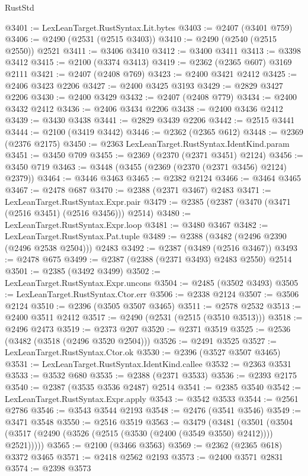 \begin{lexlean}{RustStd}
\begin{coremodule}
{\begin{coremodule}
{{{{{{{{{{{{{{{{{{{{{{{{{{{{{{{{{{{{{{{{{{{{{{{{{{@3401 := LexLeanTarget.RustSyntax.Lit.bytes
@3403 := @2407 (@3401 @759)
@3406 := @2490 (@2531 (@2515 @3403))
@3410 := @2490 (@2540 (@2515 @2550)) @2521
@3411 := @3406 @3410
@3412 := @3400 @3411
@3413 := @3398 @3412
@3415 := @2100 (@3374 @3413)
@3419 := @2362 (@2365 @607) @3169 @2111
@3421 := @2407 (@2408 @769)
@3423 := @2400 @3421 @2412
@3425 := @2406 @3423 @2206
@3427 := @2400 @3425 @3193
@3429 := @2829 @3427 @2206
@3430 := @2400 @3429
@3432 := @2407 (@2408 @779)
@3434 := @2400 @3432 @2412
@3436 := @2406 @3434 @2206
@3438 := @2400 @3436 @2412
@3439 := @3430 @3438
@3441 := @2829 @3439 @2206
@3442 := @2515 @3441
@3444 := @2100 (@3419 @3442)
@3446 := @2362 (@2365 @612)
@3448 := @2369 (@2376 @2175)
@3450 := @2363 LexLeanTarget.RustSyntax.IdentKind.param
@3451 := @3450 @709
@3455 := @2369 (@2370 (@2371 @3451) @2124)
@3456 := @3450 @719
@3463 := @3448 (@3455 (@2369 (@2370 (@2371 @3456) @2124) @2379))
@3464 := @3446 @3463
@3465 := @2382 @2124
@3466 := @3464 @3465
@3467 := @2478 @687
@3470 := @2388 (@2371 @3467) @2483
@3471 := LexLeanTarget.RustSyntax.Expr.pair
@3479 := @2385 (@2387 (@3470 (@3471 (@2516 @3451) (@2516 @3456))) @2514)
@3480 := LexLeanTarget.RustSyntax.Expr.loop
@3481 := @3480 @3467
@3482 := LexLeanTarget.RustSyntax.Pat.tuple
@3489 := @2388 (@3482 (@2496 @2390 (@2496 @2538 @2504))) @2483
@3492 := @2387 (@3489 (@2516 @3467))
@3493 := @2478 @675
@3499 := @2387 (@2388 (@2371 @3493) @2483 @2550) @2514
@3501 := @2385 (@3492 @3499)
@3502 := LexLeanTarget.RustSyntax.Expr.uncons
@3504 := @2485 (@3502 @3493)
@3505 := LexLeanTarget.RustSyntax.Ctor.err
@3506 := @2338 @2124
@3507 := @3506 @2124
@3510 := @2396 (@3505 @3507 @3465)
@3511 := @2578 @2532
@3513 := @2400 @3511 @2412
@3517 := @2490 (@2531 (@2515 (@3510 @3513)))
@3518 := @2496 @2473
@3519 := @2373 @207
@3520 := @2371 @3519
@3525 := @2536 (@3482 (@3518 (@2496 @3520 @2504)))
@3526 := @2491 @3525
@3527 := LexLeanTarget.RustSyntax.Ctor.ok
@3530 := @2396 (@3527 @3507 @3465)
@3531 := LexLeanTarget.RustSyntax.IdentKind.callee
@3532 := @2363 @3531
@3533 := @3532 @680
@3535 := @2388 (@2371 @3533)
@3536 := @2393 @2175
@3540 := @2387 (@3535 @3536 @2487) @2514
@3541 := @2385 @3540
@3542 := LexLeanTarget.RustSyntax.Expr.apply
@3543 := @3542 @3533
@3544 := @2561 @2786
@3546 := @3543 @3544 @2193
@3548 := @2476 (@3541 @3546)
@3549 := @3471 @3548
@3550 := @2516 @3519
@3563 := @3479
    (@3481
      (@3501 (@3504 (@3517 (@2490 (@3526 (@2515 (@3530 (@2400 (@3549 @3550) @2412)))) @2521)))))
@3565 := @2100 (@3466 @3563)
@3569 := @2362 (@2365 @618) @3372 @3465
@3571 := @2418 @2562 @2193
@3573 := @2400 @3571 @2831
@3574 := @2398 @3573
}}}}}}}}}}}}}}}}}}}}}}}}}}}}}}}}}}}}}}}}}}}}}}}}}}
\end{coremodule}}
\end{coremodule}
\end{lexlean}
